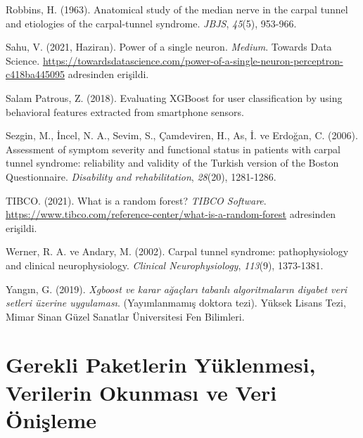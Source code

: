 \documentclass[12pt,twoside]{deuthesis}
\begin{document}
\begin{CSLReferences}
\leavevmode{}%
Robbins, H. (1963). Anatomical study of the median nerve in the carpal tunnel and etiologies of the carpal-tunnel syndrome. \emph{JBJS}, \emph{45}(5), 953-966.

\leavevmode{}%
Sahu, V. (2021, Haziran). Power of a single neuron. \emph{Medium}. Towards Data Science. \url{https://towardsdatascience.com/power-of-a-single-neuron-perceptron-c418ba445095} adresinden erişildi.

\leavevmode{}%
Salam Patrous, Z. (2018). Evaluating XGBoost for user classification by using behavioral features extracted from smartphone sensors.

\leavevmode{}%
Sezgin, M., İncel, N. A., Sevim, S., Çamdeviren, H., As, İ. ve Erdoğan, C. (2006). Assessment of symptom severity and functional status in patients with carpal tunnel syndrome: reliability and validity of the Turkish version of the Boston Questionnaire. \emph{Disability and rehabilitation}, \emph{28}(20), 1281-1286.

\leavevmode{}%
TIBCO. (2021). What is a random forest? \emph{TIBCO Software}. \url{https://www.tibco.com/reference-center/what-is-a-random-forest} adresinden erişildi.

\leavevmode{}%
Werner, R. A. ve Andary, M. (2002). Carpal tunnel syndrome: pathophysiology and clinical neurophysiology. \emph{Clinical Neurophysiology}, \emph{113}(9), 1373-1381.

\leavevmode{}%
Yangın, G. (2019). \emph{Xgboost ve karar ağaçları tabanlı algoritmaların diyabet veri setleri üzerine uygulaması}. (Yayımlanmamış doktora tezi). Yüksek Lisans Tezi, Mimar Sinan Güzel Sanatlar Üniversitesi Fen Bilimleri.

\end{CSLReferences}
\setlength{\parindent}{-0.20in}
\setlength{\leftskip}{0.20in}
\setlength{\parskip}{8pt}

\appendix

\hypertarget{gerekli-paketlerin-yuxfcklenmesi-verilerin-okunmasux131-ve-veri-uxf6niux15fleme}{%
\chapter{Gerekli Paketlerin Yüklenmesi, Verilerin Okunması ve Veri Önişleme}\label{gerekli-paketlerin-yuxfcklenmesi-verilerin-okunmasux131-ve-veri-uxf6niux15fleme}}
\end{document}
